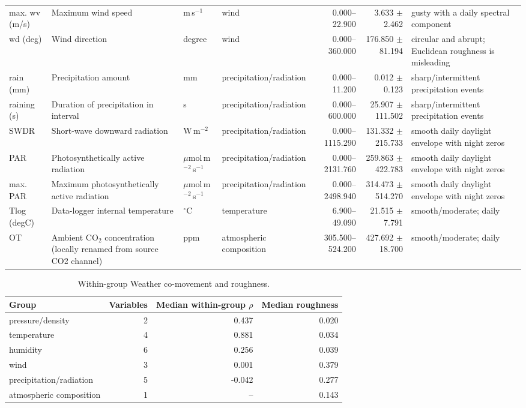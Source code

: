 \documentclass[10pt]{article}
\begin{document}
\begin{longtable}{@{}p{}p{}p{}p{}rrp{}@{}}
max. wv (m/s) & Maximum wind speed & m\,s$^{-1}$ & wind & 0.000--22.900 & 3.633 $\pm$ 2.462 & gusty with a daily spectral component \\
wd (deg) & Wind direction & degree & wind & 0.000--360.000 & 176.850 $\pm$ 81.194 & circular and abrupt; Euclidean roughness is misleading \\
rain (mm) & Precipitation amount & mm & precipitation/radiation & 0.000--11.200 & 0.012 $\pm$ 0.123 & sharp/intermittent precipitation events \\
raining (s) & Duration of precipitation in interval & s & precipitation/radiation & 0.000--600.000 & 25.907 $\pm$ 111.502 & sharp/intermittent precipitation events \\
SWDR & Short-wave downward radiation & W\,m$^{-2}$ & precipitation/radiation & 0.000--1115.290 & 131.332 $\pm$ 215.733 & smooth daily daylight envelope with night zeros \\
PAR & Photosynthetically active radiation & $\mu$mol\,m$^{-2}$\,s$^{-1}$ & precipitation/radiation & 0.000--2131.760 & 259.863 $\pm$ 422.783 & smooth daily daylight envelope with night zeros \\
max. PAR & Maximum photosynthetically active radiation & $\mu$mol\,m$^{-2}$\,s$^{-1}$ & precipitation/radiation & 0.000--2498.940 & 314.473 $\pm$ 514.270 & smooth daily daylight envelope with night zeros \\
Tlog (degC) & Data-logger internal temperature & $^\circ$C & temperature & 6.900--49.090 & 21.515 $\pm$ 7.791 & smooth/moderate; daily \\
OT & Ambient CO$_2$ concentration (locally renamed from source CO2 channel) & ppm & atmospheric composition & 305.500--524.200 & 427.692 $\pm$ 18.700 & smooth/moderate; daily \\
\bottomrule
\end{longtable}
\normalsize

\begin{table}[ht]\centering\small
\caption{Within-group Weather co-movement and roughness.}\label{tab:weather-groups}
\begin{tabular}{lrrr}
\toprule
Group & Variables & Median within-group $\rho$ & Median roughness \\
\midrule
pressure/density & 2 & 0.437 & 0.020 \\
temperature & 4 & 0.881 & 0.034 \\
humidity & 6 & 0.256 & 0.039 \\
wind & 3 & 0.001 & 0.379 \\
precipitation/radiation & 5 & -0.042 & 0.277 \\
atmospheric composition & 1 & -- & 0.143 \\
\bottomrule
\end{tabular}
\end{table}
\end{document}
